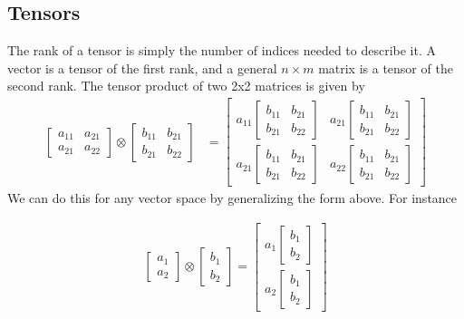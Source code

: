 \subsection{Tensors}
The rank of a tensor is simply the number of indices needed to describe it. A vector is a tensor of the first rank, and a general $n \times m$ matrix is a tensor of the second rank. The tensor product of two 2x2 matrices is given by
\begin{align}
\begin{bmatrix}
a_{11} & a_{21} \\
a_{21} & a_{22}
\end{bmatrix}
\otimes
\begin{bmatrix}
b_{11} & b_{21} \\
b_{21} & b_{22}
\end{bmatrix} &=
\begin{bmatrix}
a_{11} \begin{bmatrix}
b_{11} & b_{21} \\
b_{21} & b_{22}
\end{bmatrix}& a_{21} \begin{bmatrix}
b_{11} & b_{21} \\
b_{21} & b_{22}
\end{bmatrix}\\
a_{21} \begin{bmatrix}
b_{11} & b_{21} \\
b_{21} & b_{22}
\end{bmatrix}& a_{22}\begin{bmatrix}
b_{11} & b_{21} \\
b_{21} & b_{22}
\end{bmatrix}
\end{bmatrix}
\end{align}
We can do this for any vector space by generalizing the form above. For instance

\begin{align}
\begin{bmatrix}
a_{1}  \\
a_{2} 
\end{bmatrix}
\otimes
\begin{bmatrix}
b_{1}\\
b_{2}
\end{bmatrix} = 
\begin{bmatrix}
a_{1}  \begin{bmatrix}
b_{1}\\
b_{2}
\end{bmatrix} \\
a_{2} \begin{bmatrix}
b_{1}\\
b_{2}
\end{bmatrix} 
\end{bmatrix}
\end{align}

